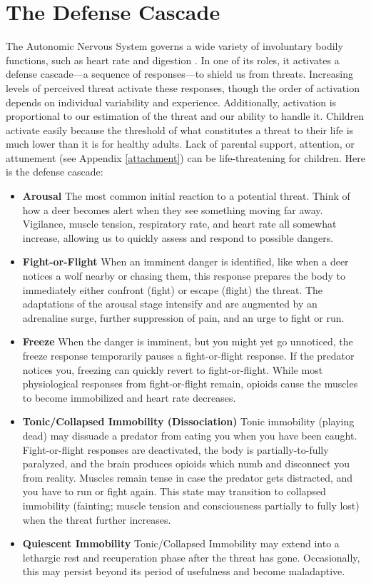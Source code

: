 \documentclass[12pt,letterpaper]{book}
\begin{document}
\section{The Defense Cascade}
\label{sec:defensecascade}
The Autonomic Nervous System governs a wide variety of involuntary bodily functions, such as heart rate and digestion \cite{kozlowskaDefenseCascade}. In one of its roles, it activates a defense cascade—a sequence of responses—to shield us from threats. Increasing levels of perceived threat activate these responses, though the order of activation depends on individual variability and experience. Additionally, activation is proportional to our estimation of the threat and our ability to handle it. Children activate easily because the threshold of what constitutes a threat to their life is much lower than it is for healthy adults. Lack of parental support, attention, or attunement (see Appendix \ref{attachment}) can be life-threatening for children. Here is the defense cascade:
\begin{itemize}
    \item \textbf{Arousal} The most common initial reaction to a potential threat. Think of how a deer becomes alert when they see something moving far away. Vigilance, muscle tension, respiratory rate, and heart rate all somewhat increase, allowing us to quickly assess and respond to possible dangers.
    \item \textbf{Fight-or-Flight} When an imminent danger is identified, like when a deer notices a wolf nearby or chasing them, this response prepares the body to immediately either confront (fight) or escape (flight) the threat. The adaptations of the arousal stage intensify and are augmented by an adrenaline surge, further suppression of pain, and an urge to fight or run.
    \item \textbf{Freeze} When the danger is imminent, but you might yet go unnoticed, the freeze response temporarily pauses a fight-or-flight response. If the predator notices you, freezing can quickly revert to fight-or-flight. While most physiological responses from fight-or-flight remain, opioids cause the muscles to become immobilized and heart rate decreases.
    \item \textbf{Tonic/Collapsed Immobility (Dissociation)} Tonic immobility (playing dead) may dissuade a predator from eating you when you have been caught. Fight-or-flight responses are deactivated, the body is partially-to-fully paralyzed, and the brain produces opioids which numb and disconnect you from reality. Muscles remain tense in case the predator gets distracted, and you have to run or fight again. This state may transition to collapsed immobility (fainting; muscle tension and consciousness partially to fully lost) when the threat further increases.
    \item \textbf{Quiescent Immobility} Tonic/Collapsed Immobility may extend into a lethargic rest and recuperation phase after the threat has gone. Occasionally, this may persist beyond its period of usefulness and become maladaptive.
\end{itemize}
\end{document}
